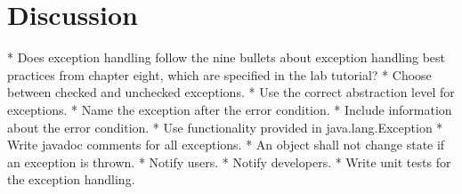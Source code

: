 \documentclass[a4paper]{scrreprt}
\newenvironment{longlisting}{\captionsetup{type=listing}}{}
\begin{document}
%
%
%
%
%

\chapter{Discussion}
\label{sec:discussion}
* Does exception handling follow the nine bullets about exception handling best
practices from chapter eight, which are specified in the lab tutorial?
    * Choose between checked and unchecked exceptions.
    * Use the correct abstraction level for exceptions.
    * Name the exception after the error condition.
    * Include information about the error condition.
    * Use functionality provided in java.lang.Exception
    * Write javadoc comments for all exceptions.
    * An object shall not change state if an exception is thrown.
    * Notify users.
    * Notify developers.
    * Write unit tests for the exception handling.
\end{document}
